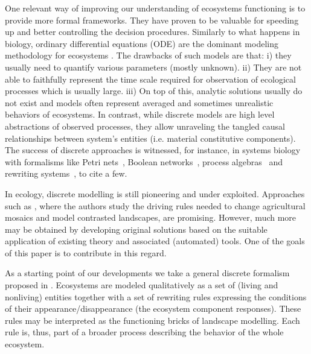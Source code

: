 \documentclass[a4paper,twoside]{article}
\begin{document}
One relevant way of improving our understanding of ecosystems functioning  is to provide more formal frameworks. 
They have proven to be valuable for speeding up and better controlling the decision procedures. 
%	
Similarly to what happens in biology, ordinary differential equations (ODE) are the dominant modeling methodology for ecosystems \cite{may72, Lotka1925}. 
The drawbacks of such  models are that: i) they usually need to quantify various parameters (mostly unknown). ii) They are not able to faithfully represent the time scale required for observation of ecological processes which is usually large. 
iii) On top of this,   analytic solutions usually do not exist and models often represent averaged and sometimes unrealistic behaviors of ecosystems. 
In contrast, while discrete models are high level abstractions of observed processes, they allow unraveling the tangled causal relationships between system's entities (i.e. material constitutive components). 
The success of discrete approaches is witnessed, for instance,  in systems biology with formalisms like Petri
 nets~\cite{DBLP:journals/nc/BaldanCMS10}, Boolean networks~\cite{thomas1973boolean},
 process algebras~\cite{journals/tcsb/Cardelli05} and rewriting systems~\cite{giavitto04a}, to cite a few. 

In ecology, discrete modelling is still pioneering and under exploited. 
Approaches such as \cite{gaucherel2012,gaucherel2014}, where the authors study the driving rules needed to change agricultural mosaics and model contrasted landscapes, are promising. However, much more may be obtained
by developing original solutions based on the suitable application of existing theory and associated (automated) tools. 
One of the goals of this paper is to contribute in this regard. 

As a starting point of our developments we take a general discrete formalism proposed in   \cite{pommereau-gaucherel2017}. Ecosystems are modeled qualitatively as a set of (living and nonliving) entities together with a set of rewriting rules expressing the conditions of their appearance/disappearance (\ie the ecosystem component responses).  
These rules  may be interpreted as the functioning bricks of landscape modelling. 
Each rule is, thus, part of a broader process describing the behavior of the whole ecosystem. 
\end{document}
